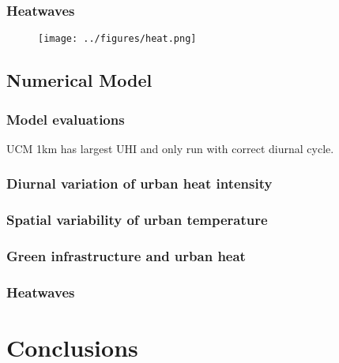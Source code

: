 \documentclass[aspectratio=169, 10pt]{beamer}
\begin{document}
\begin{frame}
\frametitle{Heatwaves}
\begin{figure}
\texttt{[image: ../figures/heat.png]}
\end{figure}
\end{frame}

\subsection{Numerical Model}

\begin{frame}
\frametitle{Model evaluations}
UCM 1km has largest UHI and only run with correct diurnal cycle. 
\end{frame}


\begin{frame}
\frametitle{Diurnal variation of urban heat intensity}
\end{frame}

\begin{frame}
\frametitle{Spatial variability of urban temperature}

\end{frame}

\begin{frame}
\frametitle{Green infrastructure and urban heat}

\end{frame}

\begin{frame}
\frametitle{Heatwaves}

\end{frame}

\section{Conclusions} 
\end{document}

